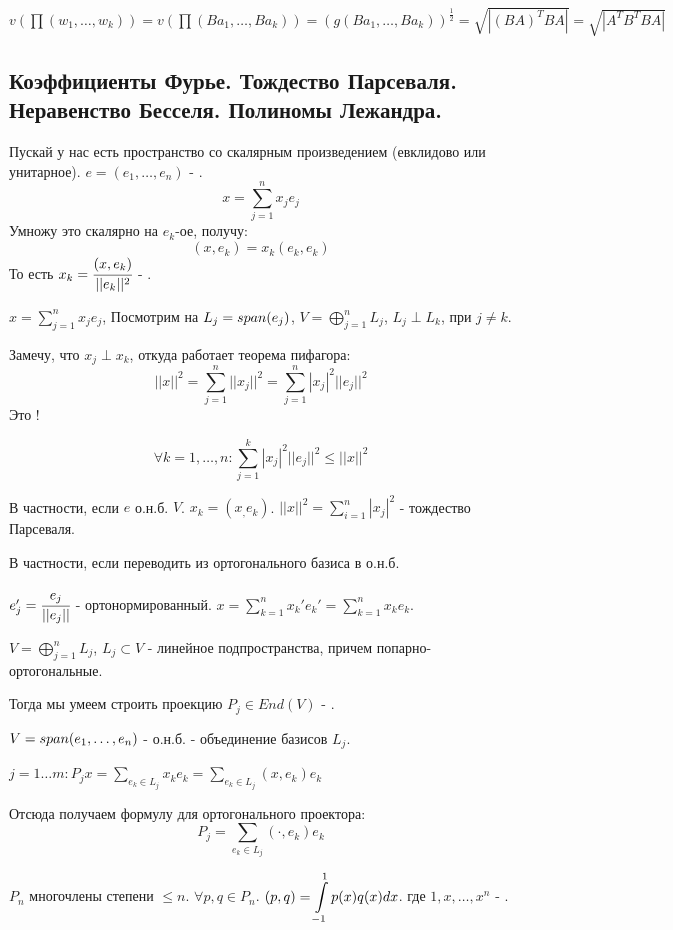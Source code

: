 $v(\prod (w_1,\ldots, w_k)) =v(\prod(Ba_1,\ldots, Ba_k))= (g(Ba_1,\ldots, Ba_k))^{\frac{1}{2}} =\sqrt{|(BA)^T BA|} = \sqrt{|A^TB^TBA|}$
\pagebreak
\subsection{Коэффициенты Фурье. Тождество Парсеваля.  Неравенство Бесселя. Полиномы Лежандра.}

Пускай у нас есть пространство со скалярным произведением (евклидово или унитарное). $e =(e_1,\ldots, e_n)$ - .
$$x = \sum\limits_{j=1}^n x_je_j$$
Умножу это скалярно на $e_k$-ое, получу:
$$(x,e_k) = x_k (e_k,e_k)$$
То есть $x_k = \cfrac{(x,e_k)}{||e_k||^2}$ - .

$x = \sum\limits_{j=1}^n x_j e_j$, Посмотрим на $L_j = span(e_j)$, $V = \bigoplus\limits_{j=1}^nL_j$, $L_j \perp L_k$, при $j\neq k$.

Замечу, что $x_j\perp x_k$, откуда работает теорема пифагора:
$$||x||^2 =\sum\limits_{j=1}^n ||x_j||^2 = \sum\limits_{j=1}^n |x_j|^2 ||e_j||^2$$ 
Это !

$$\forall k =1,\ldots, n: \sum\limits_{j=1}^k |x_j|^2||e_j||^2\leq ||x||^2$$

В частности, если $e$ о.н.б. $V$. $x_k = (x_,e_k)$. $||x||^2 = \sum\limits_{i=1}^n |x_j|^2$ - тождество Парсеваля.

В частности, если переводить из ортогонального базиса в о.н.б. 

$e_j' = \cfrac{e_j}{||e_j||}$ - ортонормированный. $x = \sum\limits_{k=1}^n x_k' e_k' = \sum\limits_{k=1}^n x_k e_k$.

 $V =\bigoplus\limits_{j=1}^n L_j$, $L_j \subset V$ - линейное подпространства, причем попарно-ортогональные. 

Тогда мы умеем строить проекцию $P_j \in End(V)$ - .

$V = span (e_1,\ldots ,e_n)$ - о.н.б. - объединение базисов $L_j$.

$j = 1\ldots m: P_j x = \sum\limits_{e_k \in L_j}x_k e_k = \sum\limits_{e_k\in L_j}(x,e_k)e_k$

Отсюда получаем формулу для ортогонального проектора:
$$P_j  = \sum\limits_{e_k\in L_j} (\cdot , e_k)e_k$$


$P_n$ многочлены степени $\leq n$. $\forall p,q \in P_n$. $(p,q) = \displaystyle\int\limits_{-1}^{1}p(x)q(x)dx$. где $1, x , \ldots, x^n$ - .

